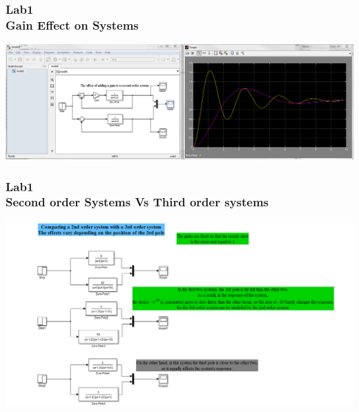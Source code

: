 \documentclass[hyperref={pdfpagelabels=true}]{beamer}
\begin{document}
\begin{frame}
\frametitle{Lab1 \\ Gain Effect on Systems}
\includegraphics[scale = 0.45]{figs/Selection_043.png}
\end{frame}

\begin{frame}
\frametitle{Lab1 \\ {\small Second order Systems Vs Third order systems}}
\includegraphics[scale = 0.27]{figs/Selection_044.png}
\end{frame}
\end{document}
